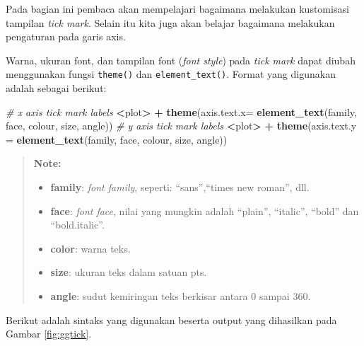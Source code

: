 \documentclass[]{book}
\newenvironment{Shaded}{\begin{snugshade}}{\end{snugshade}}
\newcommand{\KeywordTok}[1]{\textcolor[rgb]{0.13,0.29,0.53}{\textbf{#1}}}
\newcommand{\DataTypeTok}[1]{\textcolor[rgb]{0.13,0.29,0.53}{#1}}
\newcommand{\StringTok}[1]{\textcolor[rgb]{0.31,0.60,0.02}{#1}}
\newcommand{\CommentTok}[1]{\textcolor[rgb]{0.56,0.35,0.01}{\textit{#1}}}
\newcommand{\OperatorTok}[1]{\textcolor[rgb]{0.81,0.36,0.00}{\textbf{#1}}}
\newcommand{\NormalTok}[1]{#1}
\providecommand{\tightlist}{%
  \setlength{\itemsep}{0pt}\setlength{\parskip}{0pt}}
\begin{document}
Pada bagian ini pembaca akan mempelajari bagaimana melakukan kustomisasi
tampilan \emph{tick mark}. Selain itu kita juga akan belajar bagaimana
melakukan pengaturan pada garis axis.

Warna, ukuran font, dan tampilan font (\emph{font style}) pada
\emph{tick mark} dapat diubah menggunakan fungsi \texttt{theme()} dan
\texttt{element\_text()}. Format yang digunakan adalah sebagai berikut:

\begin{Shaded}
\begin{Highlighting}[]
\CommentTok{# x axis tick mark labels}
\OperatorTok{<}\NormalTok{plot}\OperatorTok{>}\StringTok{ }\OperatorTok{+}\StringTok{ }\KeywordTok{theme}\NormalTok{(}\DataTypeTok{axis.text.x=} \KeywordTok{element_text}\NormalTok{(family, face, colour, size, angle))}
\CommentTok{# y axis tick mark labels}
\OperatorTok{<}\NormalTok{plot}\OperatorTok{>}\StringTok{ }\OperatorTok{+}\StringTok{ }\KeywordTok{theme}\NormalTok{(}\DataTypeTok{axis.text.y =} \KeywordTok{element_text}\NormalTok{(family, face, colour, size, angle))}
\end{Highlighting}
\end{Shaded}

\begin{quote}
\textbf{Note: }

\begin{itemize}
\tightlist
\item
  \textbf{family}: \emph{font family}, seperti: ``sans'',``times new
  roman'', dll.
\item
  \textbf{face}: \emph{font face}, nilai yang mungkin adalah ``plain'',
  ``italic'', ``bold'' dan ``bold.italic''.
\item
  \textbf{color}: warna teks.
\item
  \textbf{size}: ukuran teks dalam satuan pts.
\item
  \textbf{angle}: sudut kemiringan teks berkisar antara 0 sampai 360.
\end{itemize}
\end{quote}

Berikut adalah sintaks yang digunakan beserta output yang dihasilkan
pada Gambar \ref{fig:ggtick}.
\end{document}
